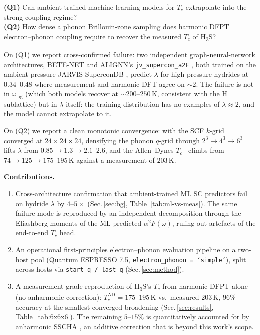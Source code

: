 \documentclass[11pt,a4paper]{article}
\begin{document}
\medskip
\noindent\textbf{(Q1)} Can ambient-trained machine-learning models for $T_c$ extrapolate
into the strong-coupling regime?\\
\textbf{(Q2)} How dense a phonon Brillouin-zone sampling does harmonic DFPT
electron--phonon coupling require to recover the measured $T_c$ of H\textsubscript{3}S?

\medskip
On (Q1) we report cross-confirmed failure: two independent graph-neural-network
architectures, BETE-NET \cite{gibson2025betenet} and ALIGNN's
\texttt{jv\_supercon\_a2F} \cite{choudhary2022alignn}, both trained on the
ambient-pressure JARVIS-SuperconDB \cite{jarvis_supercon_db}, predict
$\lambda$ for high-pressure hydrides at $0.34$--$0.48$ where measurement and harmonic DFT
agree on $\sim 2$. The failure is not in $\omega_{\log}$ (which both models recover at
$\sim 200$--$250$\,K, consistent with the H sublattice) but in $\lambda$ itself: the
training distribution has no examples of $\lambda \approx 2$, and the model cannot
extrapolate to it.

On (Q2) we report a clean monotonic convergence: with the SCF $k$-grid converged at
$24{\times}24{\times}24$, densifying the phonon $q$-grid through $2^3 \to 4^3 \to 6^3$
lifts $\lambda$ from $0.85 \to 1.3 \to 2.1$--$2.6$, and the Allen--Dynes
$T_c$~\cite{allendynes1975} climbs from $74 \to 125 \to 175$--$195$\,K against a
measurement of $203$\,K.

\medskip
\noindent\textbf{Contributions.}
\begin{enumerate}\itemsep0.3em
\item Cross-architecture confirmation that ambient-trained ML SC predictors fail on
hydride $\lambda$ by $4$--$5\times$ (Sec.\,\ref{sec:bg}, Table~\ref{tab:ml-vs-meas}).
The same failure mode is reproduced by an independent decomposition through the
Eliashberg moments \cite{eliashberg1960} of the ML-predicted $\alpha^2 F(\omega)$,
ruling out artefacts of the end-to-end $T_c$ head.
\item An operational first-principles electron--phonon evaluation pipeline on a
two-host pool (Quantum ESPRESSO 7.5, \texttt{electron\_phonon = `simple'}), split
across hosts via \texttt{start\_q / last\_q} (Sec.\,\ref{sec:method}).
\item A measurement-grade reproduction of H\textsubscript{3}S's $T_c$ from harmonic
DFPT alone (no anharmonic correction): $T_c^{\text{AD}} = 175$--$195$\,K vs.\ measured
$203$\,K, $96\%$ accuracy at the smallest converged broadening
(Sec.\,\ref{sec:results}, Table~\ref{tab:6x6x6}). The remaining $5$--$15\%$ is
quantitatively accounted for by anharmonic SSCHA \cite{errea2016h3s}, an additive
correction that is beyond this work's scope.
\end{enumerate}
\end{document}
